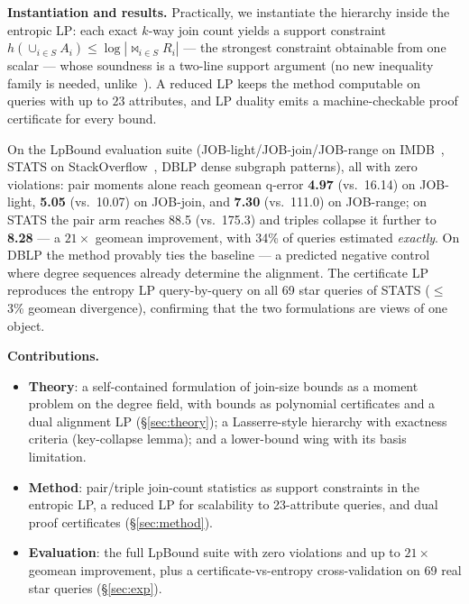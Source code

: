 \vspace{1mm}
\noindent\textbf{Instantiation and results.}
Practically, we instantiate the hierarchy inside the entropic LP:
each exact $k$-way join count yields a support constraint
$h(\cup_{i\in S}A_i) \le \log|\Join_{i\in S} R_i|$ --- the strongest
constraint obtainable from one scalar --- whose soundness is a
two-line support argument (no new inequality family is needed,
unlike~\cite{mayer2026corrbound}).  A reduced LP keeps the method
computable on queries with up to $23$ attributes, and LP duality
emits a machine-checkable proof certificate for every bound.

On the LpBound evaluation suite (JOB-light/JOB-join/JOB-range on
IMDB~\cite{leis2015howgood,leis2018query}, STATS on
StackOverflow~\cite{han2021cardinality}, DBLP dense subgraph
patterns), all with zero violations:
pair moments alone reach geomean q-error \textbf{4.97} (vs.\ 16.14)
on JOB-light, \textbf{5.05} (vs.\ 10.07) on JOB-join, and
\textbf{7.30} (vs.\ 111.0) on JOB-range; on STATS the pair arm
reaches 88.5 (vs.\ 175.3) and triples collapse it further to
\textbf{8.28} --- a $21\times$ geomean improvement, with 34\% of
queries estimated \emph{exactly}.  On DBLP the method provably ties
the baseline --- a predicted negative control where degree sequences
already determine the alignment.  The certificate LP reproduces the
entropy LP query-by-query on all 69 star queries of STATS
($\le$3\% geomean divergence), confirming that the two formulations
are views of one object.

\vspace{1mm}
\noindent\textbf{Contributions.}
\begin{itemize}[leftmargin=10pt,itemsep=1pt]
\item \textbf{Theory}: a self-contained formulation of join-size
  bounds as a moment problem on the degree field, with bounds as
  polynomial certificates and a dual alignment LP (\S\ref{sec:theory});
  a Lasserre-style hierarchy with exactness criteria (key-collapse
  lemma); and a lower-bound wing with its basis limitation.
\item \textbf{Method}: pair/triple join-count statistics as support
  constraints in the entropic LP, a reduced LP for scalability to
  23-attribute queries, and dual proof certificates
  (\S\ref{sec:method}).
\item \textbf{Evaluation}: the full LpBound suite with zero
  violations and up to $21\times$ geomean improvement, plus a
  certificate-vs-entropy cross-validation on 69 real star queries
  (\S\ref{sec:exp}).
\end{itemize}
